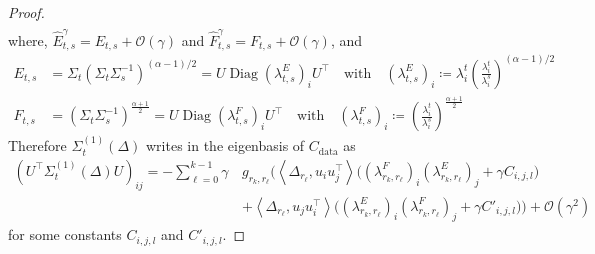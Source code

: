 \documentclass[11pt]{article}
\newcommand{\eqdef}{\coloneqq}
\newcommand{\diag}[1]{\operatorname{Diag}\left({#1}\right)}
\begin{document}
\begin{proof}
\begin{align*}
\end{align*}
where, $\hat E^\gamma_{t,s} = E_{t,s}+\mathcal{O}(\gamma)$ and $\hat F^\gamma_{t,s} = F_{t,s}+\mathcal{O}(\gamma)$, and
\begin{align}
E_{t,s} \label{eq:LE}
&= \Sigma_{t} (\Sigma_{t}\Sigma_{s}^{-1})^{(\alpha-1)/2} = U \diag{\lambda^E_{t,s}}_i U^\top \quad \text{with}  \quad 
(\lambda^E_{t,s})_i \eqdef \lambda^t_i \left(\frac{\lambda^t_i}{\lambda^s_i}\right)^{(\alpha-1)/2} \\ \label{eq:LF}
F_{t,s} &= (\Sigma_{t} \Sigma_{s}^{-1})^{\frac{\alpha+1}{2}} = U \diag{\lambda^F_{t,s}}_i U^\top \quad \text{with}  \quad 
(\lambda^F_{t,s})_i \eqdef \left(\frac{\lambda^t_i}{\lambda^s_i}\right)^{\frac{\alpha+1}{2}}
\end{align}
Therefore $\Sigma_{t}^{(1)}(\Delta)$  writes in the eigenbasis of $C_\mathrm{data}$ as  
\begin{equation*}
\begin{split}
 \left(U^\top \Sigma_{t}^{(1)}(\Delta) U\right)_{ij}
 = -  \sum_{\ell=0}^{k-1} \gamma \,  &g_{r_k,r_\ell} \Biggl( \left\langle \Delta_{r_\ell}, u_i u_j^\top \right\rangle \biggl( (\lambda^F_{r_k,r_\ell})_i (\lambda^E_{r_k,r_\ell})_j + \gamma C_{i,j, l} \biggr)\\
 &+ \left\langle \Delta_{r_\ell}, u_j u_i^\top \right\rangle \biggl( (\lambda^E_{r_k,r_\ell})_i  (\lambda^F_{r_k,r_\ell})_j + \gamma C'_{i,j,l} \biggr) \Biggr) + \mathcal{O}(\gamma^2)
\end{split}
\end{equation*}
for some constants $C_{i,j,l}$ and $C'_{i,j,l}$.


\end{proof}
\end{document}
